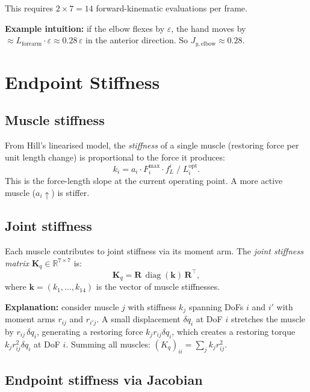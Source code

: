 \documentclass[11pt,a4paper]{article}
\begin{document}
This requires $2\times7=14$ forward-kinematic evaluations per frame.

\textbf{Example intuition:} if the elbow flexes by $\varepsilon$, the hand
moves by $\approx L_\text{forearm}\cdot\varepsilon \approx 0.28\,\varepsilon$
in the anterior direction. So $J_{y,\text{elbow}} \approx 0.28$.

\section{Endpoint Stiffness}

\subsection{Muscle stiffness}

From Hill's linearised model, the \emph{stiffness} of a single muscle
(restoring force per unit length change) is proportional to the force it
produces:
\[
  \boxed{k_i = a_i \cdot F_i^\text{max} \cdot f_L^i \;/\; L_i^\text{opt}}.
\]
This is the force-length slope at the current operating point. A more
active muscle ($a_i\uparrow$) is stiffer.

\subsection{Joint stiffness}

Each muscle contributes to joint stiffness via its moment arm. The
\emph{joint stiffness matrix} $\mathbf{K}_q \in \mathbb{R}^{7\times7}$ is:
\[
  \boxed{\mathbf{K}_q = \mathbf{R}\,\operatorname{diag}(\bm{k})\,\mathbf{R}^\top},
\]
where $\bm{k}=(k_1,\ldots,k_{14})$ is the vector of muscle stiffnesses.

\textbf{Explanation:} consider muscle $j$ with stiffness $k_j$ spanning
DoFs $i$ and $i'$ with moment arms $r_{ij}$ and $r_{i'j}$.  A small
displacement $\delta q_i$ at DoF $i$ stretches the muscle by
$r_{ij}\,\delta q_i$, generating a restoring force $k_j r_{ij}\delta q_i$,
which creates a restoring torque $k_j r_{ij}^2\delta q_i$ at DoF $i$.
Summing all muscles: $(K_q)_{ii} = \sum_j k_j r_{ij}^2$.

\subsection{Endpoint stiffness via Jacobian}
\end{document}
